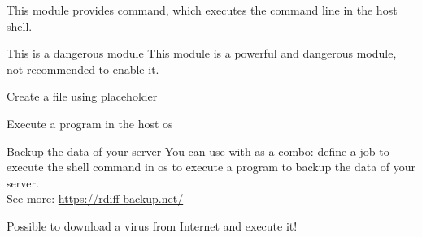 
This module provides  command, which executes the command line in the host shell.

\begin{danger}{This is a dangerous module}
    This module is a powerful and dangerous module, not recommended to enable it.
\end{danger}



\begin{example}{Create a file using placeholder}
\end{example}

\begin{example}{Execute a program in the host os}
\end{example}

\begin{example}{Backup the data of your server}
    You can use  with  as a combo: define a job to execute the shell command in os to execute a program to backup the data of your server. \\
    See more: \url{https://rdiff-backup.net/}
\end{example}

\begin{example}{Possible to download a virus from Internet and execute it!}
\end{example}

